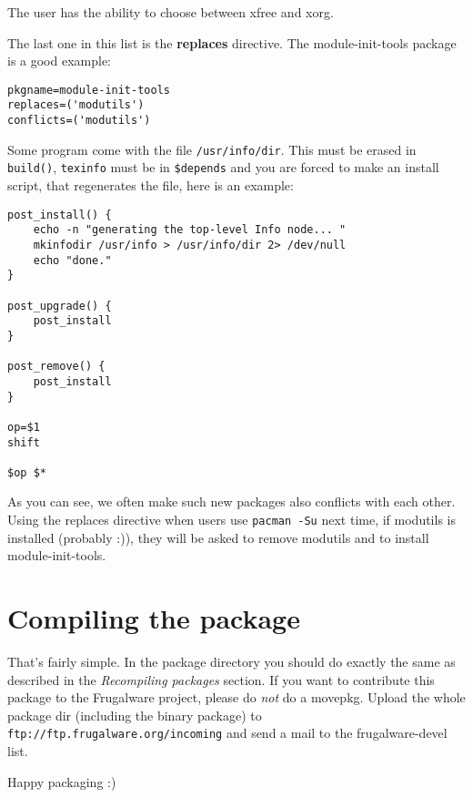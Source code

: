The user has the ability to choose between xfree and xorg.

The last one in this list is the \textbf{replaces} directive. The module-init-tools package is a good example:
\begin{verbatim}
pkgname=module-init-tools
replaces=('modutils')
conflicts=('modutils')
\end{verbatim}

Some program come with the file {\tt /usr/info/dir}. This must be erased in {\tt build()}, {\tt texinfo} must be in {\tt \$depends} and you are forced to make an install script, that regenerates the file, here is an example:
\begin{verbatim}
post_install() {
	echo -n "generating the top-level Info node... "
	mkinfodir /usr/info > /usr/info/dir 2> /dev/null
	echo "done."
}

post_upgrade() {
	post_install
}

post_remove() {
	post_install
}

op=$1
shift

$op $*
\end{verbatim}

As you can see, we often make such new packages also conflicts with each other. Using the replaces directive when users use {\tt pacman -Su} next time, if modutils is installed (probably :)), they will be asked to remove modutils and to install module-init-tools.

\section{Compiling the package}

That's fairly simple. In the package directory you should do exactly the same as described in the \textit{Recompiling packages} section. If you want to contribute this package to the Frugalware project, please do \textit{not} do a movepkg. Upload the whole package dir (including the binary package) to {\tt ftp://ftp.frugalware.org/incoming} and send a mail to the frugalware-devel list.

Happy packaging :)
